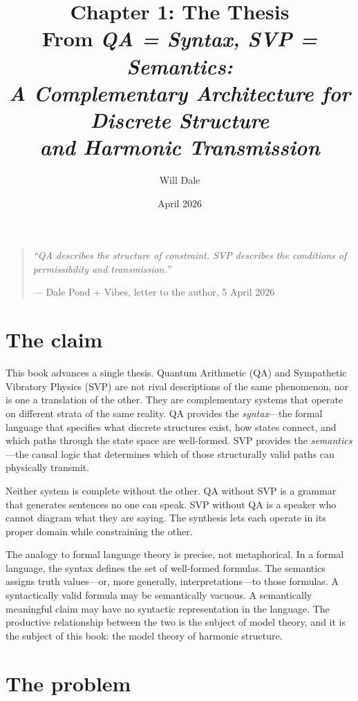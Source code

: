 \documentclass[11pt,a4paper]{article}
\title{\textbf{Chapter 1: The Thesis}\\[6pt]
\large From \emph{QA = Syntax, SVP = Semantics:\\
A Complementary Architecture for Discrete Structure\\
and Harmonic Transmission}}
\author{Will Dale}
\date{April 2026}
\begin{document}
\maketitle

\begin{quote}
\emph{``QA describes the structure of constraint. SVP describes the conditions
of permissibility and transmission.''}

\smallskip
\hfill --- Dale Pond + Vibes, letter to the author, 5 April 2026
\end{quote}

\vspace{1em}

\section{The claim}

This book advances a single thesis. Quantum Arithmetic (QA) and
Sympathetic Vibratory Physics (SVP) are not rival descriptions of the same
phenomenon, nor is one a translation of the other. They are complementary
systems that operate on different strata of the same reality. QA provides
the \emph{syntax}---the formal language that specifies what discrete
structures exist, how states connect, and which paths through the state
space are well-formed. SVP provides the \emph{semantics}---the causal
logic that determines which of those structurally valid paths can
physically transmit.

Neither system is complete without the other. QA without SVP is a grammar
that generates sentences no one can speak. SVP without QA is a speaker who
cannot diagram what they are saying. The synthesis lets each operate in its
proper domain while constraining the other.

The analogy to formal language theory is precise, not metaphorical. In a
formal language, the syntax defines the set of well-formed formulas. The
semantics assigns truth values---or, more generally, interpretations---to
those formulas. A syntactically valid formula may be semantically
vacuous. A semantically meaningful claim may have no syntactic
representation in the language. The productive relationship between the two
is the subject of model theory, and it is the subject of this book: the
model theory of harmonic structure.

\section{The problem}
\end{document}
